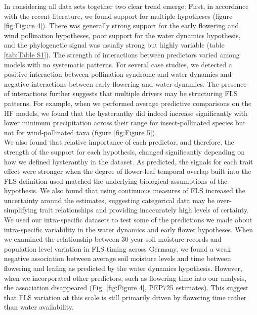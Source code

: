\documentclass[12pt]{article}
\begin{document}
\indent In considering all data sets together two clear trend emerge: First, in accordance with the recent literature, we found support for multiple hypotheses (figure \ref{fig:Figure 4}). There was generally strong support for the early flowering and wind pollination hypotheses, poor support for the water dynamics hypothesis, and the phylogenetic signal was usually strong but highly variable (table \ref{tab:Table S1}). %
The strength of interactions between predictors varied among models with no systematic patterns. For several case studies, we detected a positive interaction between pollination syndrome and water dynamics and negative interactions between early flowering and water dynamics. The presence of interactions further suggests that multiple drivers may be structuring FLS patterns. For example, when we performed average predictive comparisons on the HF models, we found that the hysteranthy did indeed increase significantly with lower minimum precipitation across their range for insect-pollinated species but not for wind-pollinated taxa (figure \ref{fig:Figure 5}).\\ %

\indent We also found that relative importance of each predictor, and therefore, the strength of the support for each hypothesis, changed significantly depending on how we defined hysteranthy in the dataset. As predicted, the signals for each trait effect were stronger when the degree of flower-leaf temporal overlap built into the FLS definition used matched the underlying biological assumptions of the hypothesis. We also found that using continuous measures of FLS increased the uncertainty around the estimates, suggesting categorical data may be over-simplifying trait relationships and providing inaccurately high levels of certainty.\\

\indent We used our intra-specific datasets to test some of the predictions we made about intra-specific variability in the water dynamics and early flower hypotheses. %
When we examined the relationship between 30 year soil moisture records \citep{DWD} and population level variation in FLS timing across Germany, we found a weak negative association between average soil moisture levels and time between flowering and leafing as predicted by the water dynamics hypothesis. However, when we incorporated other predictors, such as flowering time into our analysis, the association disappeared (Fig. \ref{fig:Figure 4}, PEP725 estimates). This suggest that FLS variation at this scale is still primarily driven by flowering time rather than water availability. \\ 
\end{document}
